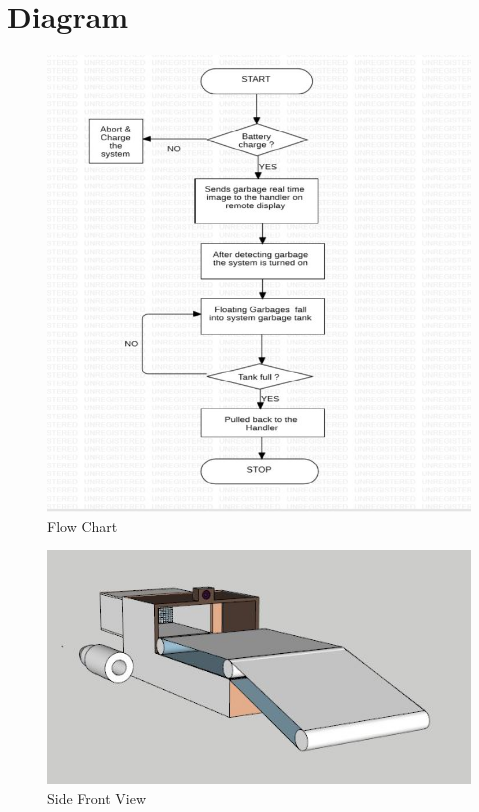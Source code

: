 \documentclass{article}
\begin{document}
\section{Diagram}
\begin{figure}[!htb]
	\includegraphics[width=\linewidth]{flowchart.jpg}
	\caption{Flow Chart}
\end{figure}
\begin{figure}
	\includegraphics[width=\linewidth]{abc.jpg}
	\caption{Side Front View}
\end{figure}
\end{document}
